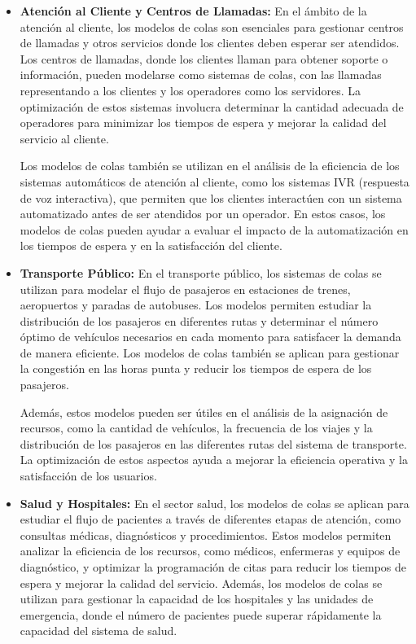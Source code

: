 \documentclass{article}
\begin{document}
\begin{itemize}
    \item \textbf{Atención al Cliente y Centros de Llamadas:}
    En el ámbito de la atención al cliente, los modelos de colas son esenciales para gestionar centros de llamadas y otros servicios donde los clientes deben esperar ser atendidos. Los centros de llamadas, donde los clientes llaman para obtener soporte o información, pueden modelarse como sistemas de colas, con las llamadas representando a los clientes y los operadores como los servidores. La optimización de estos sistemas involucra determinar la cantidad adecuada de operadores para minimizar los tiempos de espera y mejorar la calidad del servicio al cliente.

    Los modelos de colas también se utilizan en el análisis de la eficiencia de los sistemas automáticos de atención al cliente, como los sistemas IVR (respuesta de voz interactiva), que permiten que los clientes interactúen con un sistema automatizado antes de ser atendidos por un operador. En estos casos, los modelos de colas pueden ayudar a evaluar el impacto de la automatización en los tiempos de espera y en la satisfacción del cliente.

    \item \textbf{Transporte Público:}
    En el transporte público, los sistemas de colas se utilizan para modelar el flujo de pasajeros en estaciones de trenes, aeropuertos y paradas de autobuses. Los modelos permiten estudiar la distribución de los pasajeros en diferentes rutas y determinar el número óptimo de vehículos necesarios en cada momento para satisfacer la demanda de manera eficiente. Los modelos de colas también se aplican para gestionar la congestión en las horas punta y reducir los tiempos de espera de los pasajeros.

    Además, estos modelos pueden ser útiles en el análisis de la asignación de recursos, como la cantidad de vehículos, la frecuencia de los viajes y la distribución de los pasajeros en las diferentes rutas del sistema de transporte. La optimización de estos aspectos ayuda a mejorar la eficiencia operativa y la satisfacción de los usuarios.

    \item \textbf{Salud y Hospitales:}
    En el sector salud, los modelos de colas se aplican para estudiar el flujo de pacientes a través de diferentes etapas de atención, como consultas médicas, diagnósticos y procedimientos. Estos modelos permiten analizar la eficiencia de los recursos, como médicos, enfermeras y equipos de diagnóstico, y optimizar la programación de citas para reducir los tiempos de espera y mejorar la calidad del servicio. Además, los modelos de colas se utilizan para gestionar la capacidad de los hospitales y las unidades de emergencia, donde el número de pacientes puede superar rápidamente la capacidad del sistema de salud.


\end{itemize}
\end{document}

